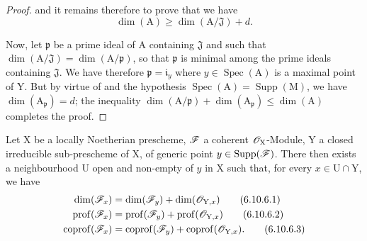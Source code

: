 \begin{proof}
and it remains therefore to prove  that we have
\[
\dim(\mathrm{A})\geqslant\dim(\mathrm{A}/\mathfrak{J})+d.
\]

Now, let $\mathfrak{p}$ be a prime ideal of $\mathrm{A}$ containing $\mathfrak{J}$ and such that $\dim(\mathrm{A}/\mathfrak{J})=\dim(\mathrm{A}/\mathfrak{p})$, so that $\mathfrak{p}$ is minimal among the prime ideals containing $\mathfrak{J}$. We have therefore $\mathfrak{p}=\mathfrak{i}_y$ where $y\in\operatorname{Spec}(\mathrm{A})$ is a maximal point of $\mathrm{Y}$. But by virtue of  and the hypothesis $\operatorname{Spec}(\mathrm{A})=\operatorname{Supp}(\mathrm{M})$, we have $\dim(\mathrm{A}_\mathfrak{p})=d$; the inequality $\dim(\mathrm{A}/\mathfrak{p})+\dim(\mathrm{A}_\mathfrak{p})\leqslant\dim(\mathrm{A})$  completes the proof.
\end{proof}

\begin{proposition}[6.10.6]
\label{IV.6.10.6}
Let $\mathrm{X}$ be a locally Noetherian prescheme, $\mathscr{F}$ a coherent $\mathscr{O}_\mathrm{X}$-Module, $\mathrm{Y}$ a closed irreducible sub-prescheme of $\mathrm{X}$, of generic point $y\in\operatorname{Supp}(\mathscr{F})$. There then exists a neighbourhood $\mathrm{U}$ open and non-empty of $y$ in $\mathrm{X}$ such that, for every $x\in\mathrm{U}\cap\mathrm{Y}$, we have
\begin{align}
  \dim(\mathscr{F}_x) &= \dim(\mathscr{F}_y)+\dim(\mathscr{O}_{\mathrm{Y},x}) \tag{6.10.6.1}\label{IV.6.10.6.1}\\
  \operatorname{prof}(\mathscr{F}_x) &= \operatorname{prof}(\mathscr{F}_y)+\operatorname{prof}(\mathscr{O}_{\mathrm{Y},x}) \tag{6.10.6.2}\label{IV.6.10.6.2}\\
  \operatorname{coprof}(\mathscr{F}_x) &= \operatorname{coprof}(\mathscr{F}_y)+\operatorname{coprof}(\mathscr{O}_{\mathrm{Y},x}). \tag{6.10.6.3}\label{IV.6.10.6.3}
\end{align}
\end{proposition}

